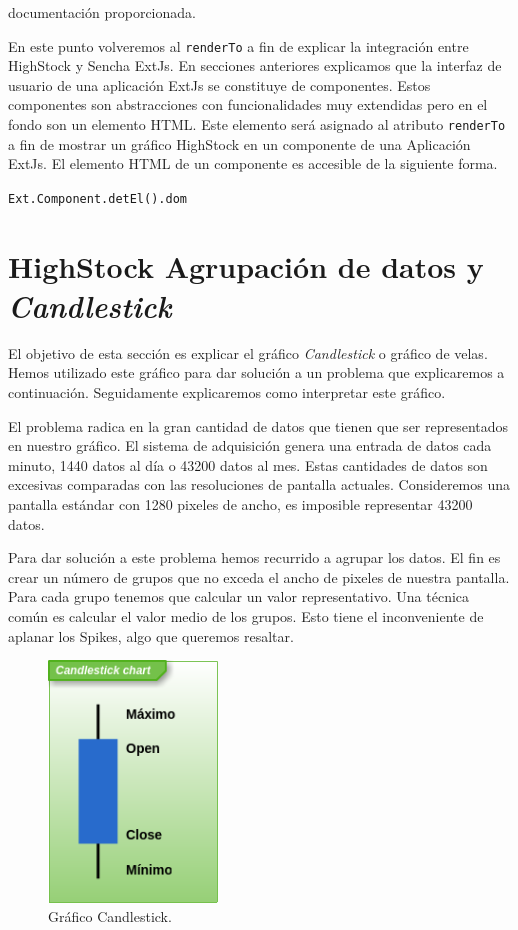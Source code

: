 	documentación proporcionada\cite{HighStockDoc}.
	\par
	En este punto volveremos al \texttt{renderTo} a fin de explicar la integración entre HighStock y Sencha ExtJs. En secciones anteriores
	explicamos que la interfaz de usuario de una aplicación ExtJs se constituye de componentes. Estos componentes son abstracciones con
	funcionalidades muy extendidas pero en el fondo son un elemento HTML. Este elemento será asignado al atributo \texttt{renderTo} a fin de
	mostrar un gráfico HighStock en un componente de una Aplicación ExtJs. El elemento HTML de un componente es accesible de la siguiente forma.
    		\begin{center} \texttt{Ext.Component.detEl().dom}  \end{center}

\section{HighStock Agrupación de datos y \emph{Candlestick}} 
	El objetivo de esta sección es explicar el gráfico \emph{Candlestick} o gráfico de velas. Hemos utilizado este gráfico para dar solución a un
	problema que explicaremos a continuación. Seguidamente explicaremos como interpretar este gráfico.
	\par
	El problema radica en la gran cantidad de datos que tienen que ser representados en nuestro gráfico. El sistema de adquisición genera una
	entrada de datos cada minuto, 1440 datos al día o 43200 datos al mes. Estas cantidades de datos son excesivas comparadas con las resoluciones
	de pantalla actuales. Consideremos una pantalla estándar con 1280 pixeles de ancho, es imposible representar 43200 datos.
	\par
	Para dar solución a este problema hemos recurrido a agrupar los datos. El fin es crear un número de grupos que no exceda el ancho de pixeles
	de nuestra pantalla. Para cada grupo tenemos que calcular un valor representativo. Una técnica común es calcular el valor medio de los grupos.
	Esto tiene el inconveniente de aplanar los Spikes, algo que queremos resaltar.
	\begin{figure}
		\centering
	        \includegraphics[keepaspectratio, width=0.40\textwidth]{./img/candlestick.png}
		\caption{Gráfico Candlestick.}
		\label{fig:candlestick}
	\end{figure}
